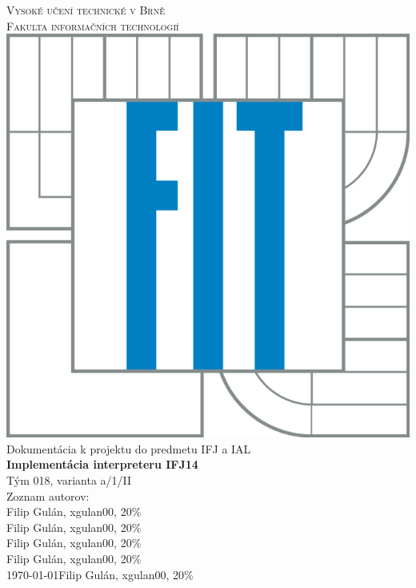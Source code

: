 \documentclass[a4paper, 11pt]{article}
\begin{document}
\begin{titlepage}
\begin{center}

\textsc{\Huge Vysoké učení technické v Brně\\ \medskip
\huge Fakulta informačních technologií}\\

\scalebox{0.33}
{
\includegraphics{logo.jpg}
}
\\

\Large Dokumentácia k projektu do predmetu IFJ a IAL\\
\Huge \textbf{Implementácia interpreteru IFJ14}\\
\LARGE Tým 018, varianta a/1/II\\

\hfill \large \Large Zoznam autorov:\\
\hfill \large Filip Gulán, xgulan00, 20\% \\
\hfill Filip Gulán, xgulan00, 20\% \\
\hfill Filip Gulán, xgulan00, 20\% \\
\hfill Filip Gulán, xgulan00, 20\% \\
\today \hfill Filip Gulán, xgulan00, 20\% \\

\end{center}
\end{titlepage}
\newpage
\end{document}

